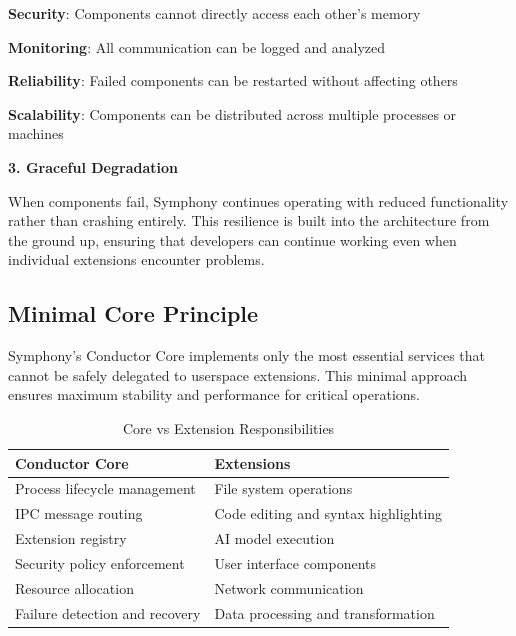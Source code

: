\begin{compactlist}
    \item \textbf{Security}: Components cannot directly access each other's memory
    \item \textbf{Monitoring}: All communication can be logged and analyzed
    \item \textbf{Reliability}: Failed components can be restarted without affecting others
    \item \textbf{Scalability}: Components can be distributed across multiple processes or machines
\end{compactlist}

\textbf{3. Graceful Degradation}

When components fail, Symphony continues operating with reduced functionality rather than crashing entirely. This resilience is built into the architecture from the ground up, ensuring that developers can continue working even when individual extensions encounter problems.

\subsection{Minimal Core Principle}
\label{subsec:minimal-core-principle}

Symphony's Conductor Core implements only the most essential services that cannot be safely delegated to userspace extensions. This minimal approach ensures maximum stability and performance for critical operations.

\begin{table}[h]
\centering
\caption{Core vs Extension Responsibilities}
\label{tab:core-extension-responsibilities}
\begin{tabular}{@{}ll@{}}
\toprule
\textbf{Conductor Core} & \textbf{Extensions} \\
\midrule
Process lifecycle management & File system operations \\
IPC message routing & Code editing and syntax highlighting \\
Extension registry & AI model execution \\
Security policy enforcement & User interface components \\
Resource allocation & Network communication \\
Failure detection and recovery & Data processing and transformation \\
\bottomrule
\end{tabular}
\end{table}

